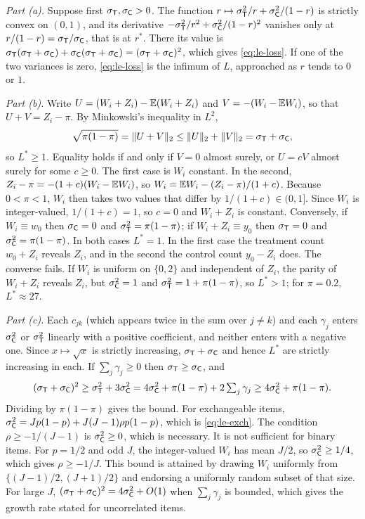 \emph{Part (a).} Suppose first $\sigma_{\mathsf{T}},\sigma_{\mathsf{C}}>0$. The function $r\mapsto\sigma_{\mathsf{T}}^2/r+\sigma_{\mathsf{C}}^2/(1-r)$ is strictly convex on $(0,1)$, and its derivative $-\sigma_{\mathsf{T}}^2/r^2+\sigma_{\mathsf{C}}^2/(1-r)^2$ vanishes only at $r/(1-r)=\sigma_{\mathsf{T}}/\sigma_{\mathsf{C}}$, that is at $r^*$. There its value is $\sigma_{\mathsf{T}}(\sigma_{\mathsf{T}}+\sigma_{\mathsf{C}})+\sigma_{\mathsf{C}}(\sigma_{\mathsf{T}}+\sigma_{\mathsf{C}})=(\sigma_{\mathsf{T}}+\sigma_{\mathsf{C}})^2$, which gives \eqref{eq:le-loss}. If one of the two variances is zero, \eqref{eq:le-loss} is the infimum of $L$, approached as $r$ tends to $0$ or $1$.

\emph{Part (b).} Write $U=(W_i+Z_i)-\mathbb{E}(W_i+Z_i)$ and $V=-(W_i-\mathbb{E} W_i)$, so that $U+V=Z_i-\pi$. By Minkowski's inequality in $L^2$,
\[
  \sqrt{\pi(1-\pi)}=\|U+V\|_2\le\|U\|_2+\|V\|_2=\sigma_{\mathsf{T}}+\sigma_{\mathsf{C}},
\]
so $L^*\ge1$. Equality holds if and only if $V=0$ almost surely, or $U=cV$ almost surely for some $c\ge0$. The first case is $W_i$ constant. In the second, $Z_i-\pi=-(1+c)(W_i-\mathbb{E} W_i)$, so $W_i=\mathbb{E} W_i-(Z_i-\pi)/(1+c)$. Because $0<\pi<1$, $W_i$ then takes two values that differ by $1/(1+c)\in(0,1]$. Since $W_i$ is integer-valued, $1/(1+c)=1$, so $c=0$ and $W_i+Z_i$ is constant. Conversely, if $W_i\equiv w_0$ then $\sigma_{\mathsf{C}}=0$ and $\sigma_{\mathsf{T}}^2=\pi(1-\pi)$; if $W_i+Z_i\equiv y_0$ then $\sigma_{\mathsf{T}}=0$ and $\sigma_{\mathsf{C}}^2=\pi(1-\pi)$. In both cases $L^*=1$. In the first case the treatment count $w_0+Z_i$ reveals $Z_i$, and in the second the control count $y_0-Z_i$ does. The converse fails. If $W_i$ is uniform on $\{0,2\}$ and independent of $Z_i$, the parity of $W_i+Z_i$ reveals $Z_i$, but $\sigma_{\mathsf{C}}^2=1$ and $\sigma_{\mathsf{T}}^2=1+\pi(1-\pi)$, so $L^*>1$; for $\pi=0.2$, $L^*\approx27$.

\emph{Part (c).} Each $c_{jk}$ (which appears twice in the sum over $j\ne k$) and each $\gamma_j$ enters $\sigma_{\mathsf{C}}^2$ or $\sigma_{\mathsf{T}}^2$ linearly with a positive coefficient, and neither enters with a negative one. Since $x\mapsto\sqrt x$ is strictly increasing, $\sigma_{\mathsf{T}}+\sigma_{\mathsf{C}}$ and hence $L^*$ are strictly increasing in each. If $\sum_j\gamma_j\ge0$ then $\sigma_{\mathsf{T}}\ge\sigma_{\mathsf{C}}$, and
\[
  (\sigma_{\mathsf{T}}+\sigma_{\mathsf{C}})^2\ge\sigma_{\mathsf{T}}^2+3\sigma_{\mathsf{C}}^2=4\sigma_{\mathsf{C}}^2+\pi(1-\pi)+2\textstyle\sum_j\gamma_j\ge4\sigma_{\mathsf{C}}^2+\pi(1-\pi).
\]
Dividing by $\pi(1-\pi)$ gives the bound. For exchangeable items, $\sigma_{\mathsf{C}}^2=Jp(1-p)+J(J-1)\rho p(1-p)$, which is \eqref{eq:le-exch}. The condition $\rho\ge-1/(J-1)$ is $\sigma_{\mathsf{C}}^2\ge0$, which is necessary. It is not sufficient for binary items. For $p=1/2$ and odd $J$, the integer-valued $W_i$ has mean $J/2$, so $\sigma_{\mathsf{C}}^2\ge1/4$, which gives $\rho\ge-1/J$. This bound is attained by drawing $W_i$ uniformly from $\{(J-1)/2,(J+1)/2\}$ and endorsing a uniformly random subset of that size. For large $J$, $(\sigma_{\mathsf{T}}+\sigma_{\mathsf{C}})^2=4\sigma_{\mathsf{C}}^2+O(1)$ when $\sum_j\gamma_j$ is bounded, which gives the growth rate stated for uncorrelated items.

